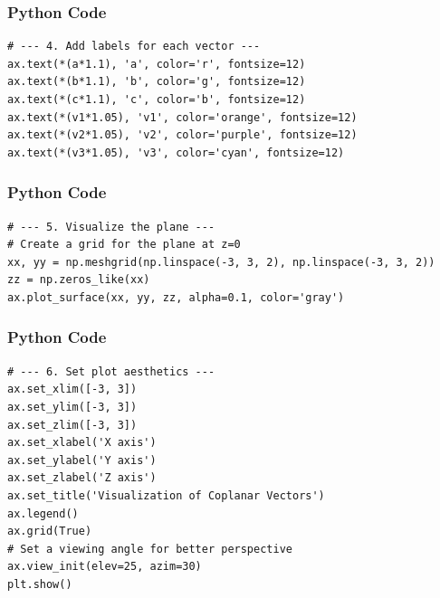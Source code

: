 \documentclass{beamer}
\begin{document}
\begin{frame}[fragile]
    \frametitle{Python Code}

    \begin{lstlisting}
# --- 4. Add labels for each vector ---
ax.text(*(a*1.1), 'a', color='r', fontsize=12)
ax.text(*(b*1.1), 'b', color='g', fontsize=12)
ax.text(*(c*1.1), 'c', color='b', fontsize=12)
ax.text(*(v1*1.05), 'v1', color='orange', fontsize=12)
ax.text(*(v2*1.05), 'v2', color='purple', fontsize=12)
ax.text(*(v3*1.05), 'v3', color='cyan', fontsize=12)
\end{lstlisting}
\end{frame}

 
\begin{frame}[fragile]
    \frametitle{Python Code}
    \begin{lstlisting}
# --- 5. Visualize the plane ---
# Create a grid for the plane at z=0
xx, yy = np.meshgrid(np.linspace(-3, 3, 2), np.linspace(-3, 3, 2))
zz = np.zeros_like(xx)
ax.plot_surface(xx, yy, zz, alpha=0.1, color='gray')

\end{lstlisting}
\end{frame}

\begin{frame}[fragile]
    \frametitle{Python Code}
    \begin{lstlisting}
# --- 6. Set plot aesthetics ---
ax.set_xlim([-3, 3])
ax.set_ylim([-3, 3])
ax.set_zlim([-3, 3])
ax.set_xlabel('X axis')
ax.set_ylabel('Y axis')
ax.set_zlabel('Z axis')
ax.set_title('Visualization of Coplanar Vectors')
ax.legend()
ax.grid(True)
# Set a viewing angle for better perspective
ax.view_init(elev=25, azim=30)
plt.show()
\end{lstlisting}
\end{frame}
\end{document}
